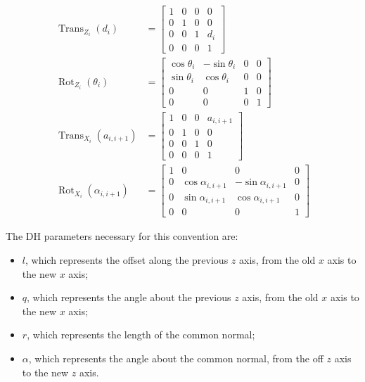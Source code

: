 \begin{subequations}
    \begin{align}
        \operatorname{Trans}_{Z_{i}}(d_i) &=
        \begin{bmatrix}
            1 & 0 & 0 & 0 \\
            0 & 1 & 0 & 0 \\
            0 & 0 & 1 & d_i \\
            0 & 0 & 0 & 1
        \end{bmatrix} \label{eq:TransZ} \\
        \operatorname{Rot}_{Z_{i}}(\theta_i) &= 
        \begin{bmatrix}
            \cos\theta_i & -\sin\theta_i & 0 & 0 \\
            \sin\theta_i &  \cos\theta_i & 0 & 0 \\
            0 & 0 & 1 & 0 \\
            0 & 0 & 0 & 1
        \end{bmatrix} \label{eq:RotZ} \\
        \operatorname{Trans}_{X_i}(a_{i,i+1}) &= 
        \begin{bmatrix}
            1 & 0 & 0 & a_{i,i+1} \\
            0 & 1 & 0 & 0 \\
            0 & 0 & 1 & 0 \\
            0 & 0 & 0 & 1
        \end{bmatrix} \label{eq:TransX} \\
        \operatorname{Rot}_{X_i}(\alpha_{i,i+1}) &= 
        \begin{bmatrix}
            1 & 0 & 0 & 0 \\
            0 & \cos\alpha_{i,i+1} & -\sin\alpha_{i,i+1} & 0 \\
            0 & \sin\alpha_{i,i+1} & \cos\alpha_{i,i+1} & 0 \\
            0 & 0 & 0 & 1
        \end{bmatrix} \label{eq:RotX}
    \end{align}
\end{subequations}

The DH parameters necessary for this convention are:

\begin{itemize}
    \item $l$, which represents the offset along the previous $z$ axis, from the old $x$ axis to the new $x$ axis;
    \item $q$, which represents the angle about the previous $z$ axis, from the old $x$ axis to the new $x$ axis;
    \item $r$, which represents the length of the common normal;
    \item $\alpha$, which represents the angle about the common normal, from the off $z$ axis to the new $z$ axis.
\end{itemize}

